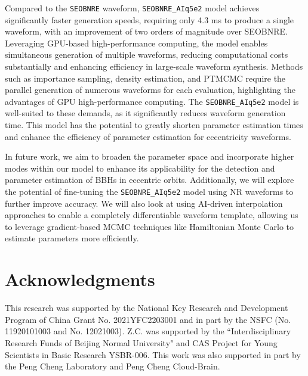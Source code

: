 \documentclass[
reprint,
superscriptaddress,
amsmath,amssymb,
aps,
prd,
floatfix,
]{revtex4-2}
\begin{document}
Compared to the \texttt{SEOBNRE} waveform, \texttt{SEOBNRE\_AIq5e2} model achieves significantly faster generation speeds, requiring only 4.3 ms to produce a single waveform, with an improvement of two orders of magnitude over SEOBNRE. 
Leveraging GPU-based high-performance computing, the model enables simultaneous generation of multiple waveforms, reducing computational costs substantially and enhancing efficiency in large-scale waveform synthesis.
Methods such as importance sampling, density estimation, and PTMCMC require the parallel generation of numerous waveforms for each evaluation, highlighting the advantages of GPU high-performance computing. 
The \texttt{SEOBNRE\_AIq5e2} model is well-suited to these demands, as it significantly reduces waveform generation time. 
This model has the potential to greatly shorten parameter estimation times and enhance the efficiency of parameter estimation for eccentricity waveforms.



In future work, we aim to broaden the parameter space and incorporate higher modes within our model to enhance its applicability for the detection and parameter estimation of BBHs in eccentric orbits. Additionally, we will explore the potential of fine-tuning the \texttt{SEOBNRE\_AIq5e2} model using NR waveforms to further improve accuracy. 
We will also look at using AI-driven interpolation approaches to enable a completely differentiable waveform template, allowing us to leverage gradient-based MCMC techniques like Hamiltonian Monte Carlo \cite{bouffanaisBayesianInferenceBinary2019} to estimate parameters more efficiently.


\section*{Acknowledgments}
	This research was supported by the National Key Research and Development Program of China Grant No. 2021YFC2203001 and in part by the NSFC (No. 11920101003 and No. 12021003). 
	Z.C. was supported by the “Interdisciplinary Research Funds of Beijing Normal University" and CAS Project for Young Scientists in Basic Research YSBR-006.
      This work was also supported in part by the Peng Cheng Laboratory and Peng Cheng Cloud-Brain. 




\end{document}
